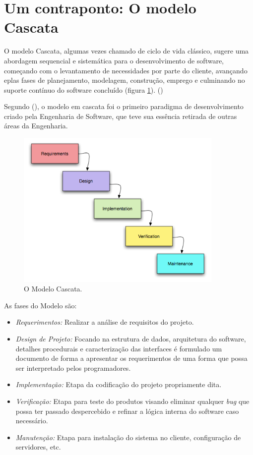 \section{Um contraponto: O modelo Cascata}
    \par O modelo Cascata, algumas vezes chamado de ciclo de vida clássico, sugere uma abordagem sequencial e sistemática para o desenvolvimento de software, começando com o levantamento de necessidades por parte do cliente, avançando eplas fases de planejamento, modelagem, construção, emprego e culminando no suporte contínuo do software concluído (figura \ref{fig:waterfall}). (\cite{pressman:11})
    \par Segundo  (\cite{pressman:11}), o modelo em cascata foi o primeiro paradigma de desenvolvimento criado pela Engenharia de Software, que teve sua essência retirada de outras áreas da Engenharia.
\begin{figure}[htb]
\centering
\includegraphics[width=10cm]{figuras/waterfall}
\caption{\label{fig:waterfall}O Modelo Cascata.}
\end{figure}
	\par As fases do Modelo são:
\begin{itemize}
\item \emph{ Requerimentos:} Realizar a análise de requisitos do projeto.
\item \emph{ Design de Projeto:}  Focando na estrutura de dados, arquitetura do software, detalhes procedurais e caracterização das interfaces é formulado um documento de forma a apresentar os requerimentos de uma forma que possa ser interpretado pelos programadores.
\item \emph{ Implementação:} Etapa da codificação do projeto propriamente dita.
\item \emph{  Verificação: } Etapa para teste do produtos visando eliminar qualquer \emph{bug} que possa ter passado despercebido e refinar a lógica interna do software caso necessário.
\item \emph{ Manutenção: } Etapa para instalação do sistema no cliente, configuração de servidores, etc.
\end{itemize}

